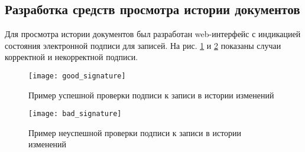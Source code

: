 \subsection{Разработка средств просмотра истории документов} \label{git_history}

Для просмотра истории документов был разработан web-интерфейс с индикацией состояния электронной подписи для записей. На рис. \ref{img:good_signature} и \ref{img:bad_signature} показаны случаи корректной и некорректной подписи.

\begin{figure}[h!]
	\centering
	\texttt{[image: good\_signature]}
	\caption{Пример успешной проверки подписи к записи в истории изменений}
	\label{img:good_signature}
\end{figure}

\begin{figure}[h!]
	\centering
	\texttt{[image: bad\_signature]}
	\caption{Пример неуспешной проверки подписи к записи в истории изменений}
	\label{img:bad_signature}
\end{figure}